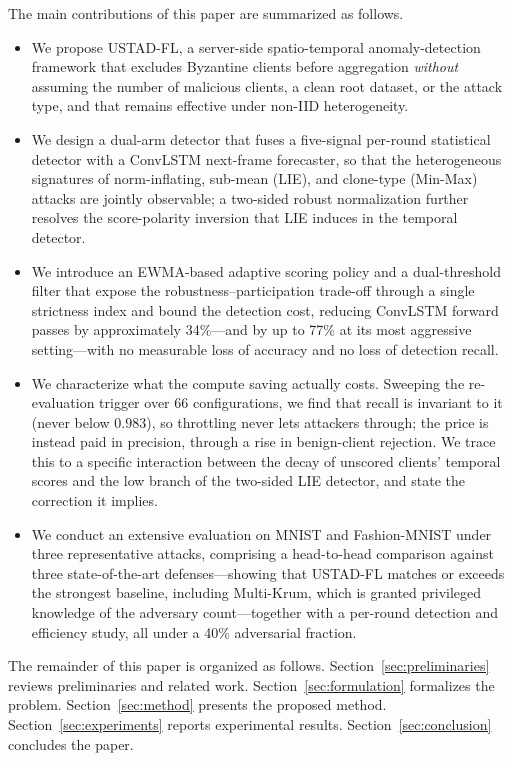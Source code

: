 \documentclass[journal]{IEEEtran}
\begin{document}
The main contributions of this paper are summarized as follows.
\begin{itemize}
    \item We propose USTAD-FL, a server-side spatio-temporal anomaly-detection framework that excludes Byzantine clients before aggregation \emph{without} assuming the number of malicious clients, a clean root dataset, or the attack type, and that remains effective under non-IID heterogeneity.
    \item We design a dual-arm detector that fuses a five-signal per-round statistical detector with a ConvLSTM next-frame forecaster, so that the heterogeneous signatures of norm-inflating, sub-mean (LIE), and clone-type (Min-Max) attacks are jointly observable; a two-sided robust normalization further resolves the score-polarity inversion that LIE induces in the temporal detector.
    \item We introduce an EWMA-based adaptive scoring policy and a dual-threshold filter that expose the robustness--participation trade-off through a single strictness index and bound the detection cost, reducing ConvLSTM forward passes by approximately 34\%---and by up to 77\% at its most aggressive setting---with no measurable loss of accuracy and no loss of detection recall.
    \item We characterize what the compute saving actually costs. Sweeping the re-evaluation trigger over $66$ configurations, we find that recall is invariant to it (never below $0.983$), so throttling never lets attackers through; the price is instead paid in precision, through a rise in benign-client rejection. We trace this to a specific interaction between the decay of unscored clients' temporal scores and the low branch of the two-sided LIE detector, and state the correction it implies.
    \item We conduct an extensive evaluation on MNIST and Fashion-MNIST under three representative attacks, comprising a head-to-head comparison against three state-of-the-art defenses---showing that USTAD-FL matches or exceeds the strongest baseline, including Multi-Krum, which is granted privileged knowledge of the adversary count---together with a per-round detection and efficiency study, all under a 40\% adversarial fraction.
\end{itemize}

The remainder of this paper is organized as follows. Section~\ref{sec:preliminaries} reviews preliminaries and related work. Section~\ref{sec:formulation} formalizes the problem. Section~\ref{sec:method} presents the proposed method. Section~\ref{sec:experiments} reports experimental results. Section~\ref{sec:conclusion} concludes the paper.
\end{document}
